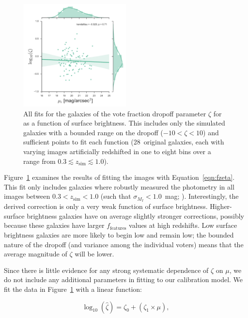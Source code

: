 \documentclass[a4paper,fleqn,usenatbib]{mnras}
\begin{document}
\begin{figure}
\center
\includegraphics[width=0.5\textwidth]{figures/zeta_mu.pdf}
\caption{All fits for the \ferengi{} galaxies of the vote fraction dropoff
parameter $\zeta$ for \ffeatures{} as a function of surface brightness. This
includes only the simulated galaxies with a bounded range on the dropoff
($-10<\zeta<10$) and sufficient points to fit each function (28~original
galaxies, each with varying images artificially redshifted in one to eight bins over a range from $0.3\lesssim z_\mathrm{sim}\lesssim1.0$). 
}
\label{fig:zeta_mu}
\end{figure}

Figure~\ref{fig:zeta_mu} examines the results of fitting the \ferengi{} images
with Equation~\ref{eqn:fzeta}. This fit only includes galaxies where
\sextractor{} robustly measured the photometry in all images between
$0.3<z_\mathrm{sim}<1.0$ (such that $\sigma_{M_I}<1.0$~mag; \citealt{mel16}). Interestingly, the
derived correction is only a very weak function of surface brightness.
Higher-surface brightness galaxies have on average slightly stronger
corrections, possibly because these galaxies have larger $f_\textrm{features}$
values at high redshifts. Low surface brightness galaxies are more likely to
begin low and remain low; the bounded nature of the dropoff (and variance among
the individual voters) means that the average magnitude of $\zeta$ will be
lower. 

Since there is little evidence for any strong systematic dependence of $\zeta$
on $\mu$, we do not include any additional parameters in fitting to our
calibration model.  We fit the data in Figure~\ref{fig:zeta_mu} with a linear
function:

\begin{equation}
\log_{10}(\hat\zeta) = \zeta_0 + (\zeta_1 \times \mu),
\label{eqn:zetafit}
\end{equation}
\end{document}
